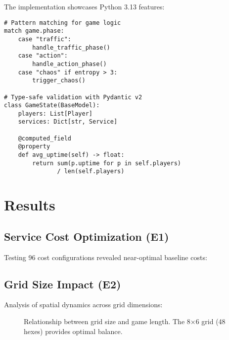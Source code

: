 \documentclass[sigconf]{acmart}
\begin{document}
The implementation showcases Python 3.13 features:

\begin{verbatim}
# Pattern matching for game logic
match game.phase:
    case "traffic": 
        handle_traffic_phase()
    case "action": 
        handle_action_phase()
    case "chaos" if entropy > 3: 
        trigger_chaos()

# Type-safe validation with Pydantic v2
class GameState(BaseModel):
    players: List[Player]
    services: Dict[str, Service]
    
    @computed_field
    @property
    def avg_uptime(self) -> float:
        return sum(p.uptime for p in self.players) 
               / len(self.players)
\end{verbatim}

\section{Results}

\subsection{Service Cost Optimization (E1)}

Testing 96 cost configurations revealed near-optimal baseline costs:



\subsection{Grid Size Impact (E2)}

Analysis of spatial dynamics across grid dimensions:

\begin{figure}[h]
\centering
{}
\caption{Relationship between grid size and game length. The 8×6 grid (48 hexes) provides optimal balance.}
\label{fig:gridsize}
\end{figure}
\end{document}
